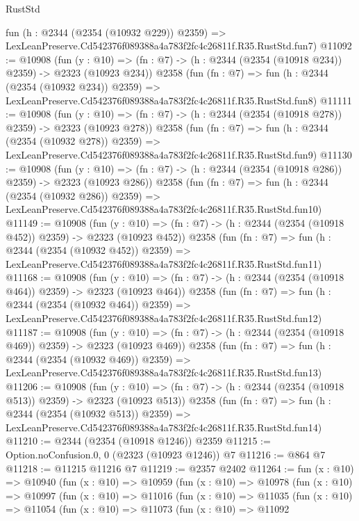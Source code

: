 \begin{lexlean}{RustStd}
\begin{coremodule}
    fun (h : @2344 (@2354 (@10932 @229)) @2359) =>
    LexLeanPreserve.Cd542376f089388a4a783f2fc4c26811f.R35.RustStd.fun7)
@11092 := @10908
    (fun (y : @10) => (fn : @7) -> (h : @2344 (@2354 (@10918 @234)) @2359) -> @2323 (@10923 @234))
    @2358
    (fun (fn : @7) =>
    fun (h : @2344 (@2354 (@10932 @234)) @2359) =>
    LexLeanPreserve.Cd542376f089388a4a783f2fc4c26811f.R35.RustStd.fun8)
@11111 := @10908
    (fun (y : @10) => (fn : @7) -> (h : @2344 (@2354 (@10918 @278)) @2359) -> @2323 (@10923 @278))
    @2358
    (fun (fn : @7) =>
    fun (h : @2344 (@2354 (@10932 @278)) @2359) =>
    LexLeanPreserve.Cd542376f089388a4a783f2fc4c26811f.R35.RustStd.fun9)
@11130 := @10908
    (fun (y : @10) => (fn : @7) -> (h : @2344 (@2354 (@10918 @286)) @2359) -> @2323 (@10923 @286))
    @2358
    (fun (fn : @7) =>
    fun (h : @2344 (@2354 (@10932 @286)) @2359) =>
    LexLeanPreserve.Cd542376f089388a4a783f2fc4c26811f.R35.RustStd.fun10)
@11149 := @10908
    (fun (y : @10) => (fn : @7) -> (h : @2344 (@2354 (@10918 @452)) @2359) -> @2323 (@10923 @452))
    @2358
    (fun (fn : @7) =>
    fun (h : @2344 (@2354 (@10932 @452)) @2359) =>
    LexLeanPreserve.Cd542376f089388a4a783f2fc4c26811f.R35.RustStd.fun11)
@11168 := @10908
    (fun (y : @10) => (fn : @7) -> (h : @2344 (@2354 (@10918 @464)) @2359) -> @2323 (@10923 @464))
    @2358
    (fun (fn : @7) =>
    fun (h : @2344 (@2354 (@10932 @464)) @2359) =>
    LexLeanPreserve.Cd542376f089388a4a783f2fc4c26811f.R35.RustStd.fun12)
@11187 := @10908
    (fun (y : @10) => (fn : @7) -> (h : @2344 (@2354 (@10918 @469)) @2359) -> @2323 (@10923 @469))
    @2358
    (fun (fn : @7) =>
    fun (h : @2344 (@2354 (@10932 @469)) @2359) =>
    LexLeanPreserve.Cd542376f089388a4a783f2fc4c26811f.R35.RustStd.fun13)
@11206 := @10908
    (fun (y : @10) => (fn : @7) -> (h : @2344 (@2354 (@10918 @513)) @2359) -> @2323 (@10923 @513))
    @2358
    (fun (fn : @7) =>
    fun (h : @2344 (@2354 (@10932 @513)) @2359) =>
    LexLeanPreserve.Cd542376f089388a4a783f2fc4c26811f.R35.RustStd.fun14)
@11210 := @2344 (@2354 (@10918 @1246)) @2359
@11215 := Option.noConfusion.{0, 0} (@2323 (@10923 @1246)) @7
@11216 := @864 @7
@11218 := @11215 @11216 @7
@11219 := @2357 @2402
@11264 := fun (x : @10) =>
  @10940
    (fun (x : @10) =>
    @10959
      (fun (x : @10) =>
      @10978
        (fun (x : @10) =>
        @10997
          (fun (x : @10) =>
          @11016
            (fun (x : @10) =>
            @11035
              (fun (x : @10) =>
              @11054
                (fun (x : @10) =>
                @11073
                  (fun (x : @10) =>
                  @11092

\end{coremodule}
\end{lexlean}
